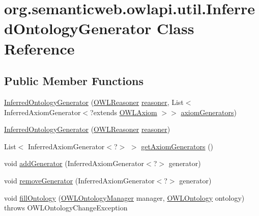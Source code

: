 \hypertarget{classorg_1_1semanticweb_1_1owlapi_1_1util_1_1_inferred_ontology_generator}{\section{org.\-semanticweb.\-owlapi.\-util.\-Inferred\-Ontology\-Generator Class Reference}
\label{classorg_1_1semanticweb_1_1owlapi_1_1util_1_1_inferred_ontology_generator}
}
\subsection*{Public Member Functions}
\begin{DoxyCompactItemize}
\item 
\hyperlink{classorg_1_1semanticweb_1_1owlapi_1_1util_1_1_inferred_ontology_generator_a20a318771567d4d86794b5f3b9cae1bd}{Inferred\-Ontology\-Generator} (\hyperlink{interfaceorg_1_1semanticweb_1_1owlapi_1_1reasoner_1_1_o_w_l_reasoner}{O\-W\-L\-Reasoner} \hyperlink{classorg_1_1semanticweb_1_1owlapi_1_1util_1_1_inferred_ontology_generator_a8ce0bb500eee27e86154042020116fda}{reasoner}, List$<$ Inferred\-Axiom\-Generator$<$?extends \hyperlink{interfaceorg_1_1semanticweb_1_1owlapi_1_1model_1_1_o_w_l_axiom}{O\-W\-L\-Axiom} $>$$>$ \hyperlink{classorg_1_1semanticweb_1_1owlapi_1_1util_1_1_inferred_ontology_generator_ab09a0a93f836a169c298b18df6ea7f04}{axiom\-Generators})
\item 
\hyperlink{classorg_1_1semanticweb_1_1owlapi_1_1util_1_1_inferred_ontology_generator_aa9b51c2ea3165bb39e283e7c0575538d}{Inferred\-Ontology\-Generator} (\hyperlink{interfaceorg_1_1semanticweb_1_1owlapi_1_1reasoner_1_1_o_w_l_reasoner}{O\-W\-L\-Reasoner} \hyperlink{classorg_1_1semanticweb_1_1owlapi_1_1util_1_1_inferred_ontology_generator_a8ce0bb500eee27e86154042020116fda}{reasoner})
\item 
List$<$ Inferred\-Axiom\-Generator$<$?$>$ $>$ \hyperlink{classorg_1_1semanticweb_1_1owlapi_1_1util_1_1_inferred_ontology_generator_ac0c3411f5adf94fec1ca0cad392e79a9}{get\-Axiom\-Generators} ()
\item 
void \hyperlink{classorg_1_1semanticweb_1_1owlapi_1_1util_1_1_inferred_ontology_generator_a42b2ca969cf747fea11640334eff2eb4}{add\-Generator} (Inferred\-Axiom\-Generator$<$?$>$ generator)
\item 
void \hyperlink{classorg_1_1semanticweb_1_1owlapi_1_1util_1_1_inferred_ontology_generator_af5dc44599407c597d86a8ffeab8bb38e}{remove\-Generator} (Inferred\-Axiom\-Generator$<$?$>$ generator)
\item 
void \hyperlink{classorg_1_1semanticweb_1_1owlapi_1_1util_1_1_inferred_ontology_generator_a9cd766194f413be60d3a27a1bd7c4cdf}{fill\-Ontology} (\hyperlink{interfaceorg_1_1semanticweb_1_1owlapi_1_1model_1_1_o_w_l_ontology_manager}{O\-W\-L\-Ontology\-Manager} manager, \hyperlink{interfaceorg_1_1semanticweb_1_1owlapi_1_1model_1_1_o_w_l_ontology}{O\-W\-L\-Ontology} ontology)  throws O\-W\-L\-Ontology\-Change\-Exception 
\end{DoxyCompactItemize}
